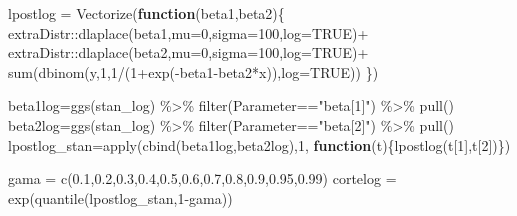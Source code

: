 \documentclass[
]{book}
\newenvironment{Shaded}{\begin{snugshade}}{\end{snugshade}}
\newcommand{\AttributeTok}[1]{\textcolor[rgb]{0.77,0.63,0.00}{#1}}
\newcommand{\ConstantTok}[1]{\textcolor[rgb]{0.00,0.00,0.00}{#1}}
\newcommand{\ControlFlowTok}[1]{\textcolor[rgb]{0.13,0.29,0.53}{\textbf{#1}}}
\newcommand{\DecValTok}[1]{\textcolor[rgb]{0.00,0.00,0.81}{#1}}
\newcommand{\FloatTok}[1]{\textcolor[rgb]{0.00,0.00,0.81}{#1}}
\newcommand{\FunctionTok}[1]{\textcolor[rgb]{0.00,0.00,0.00}{#1}}
\newcommand{\NormalTok}[1]{#1}
\newcommand{\OtherTok}[1]{\textcolor[rgb]{0.56,0.35,0.01}{#1}}
\newcommand{\SpecialCharTok}[1]{\textcolor[rgb]{0.00,0.00,0.00}{#1}}
\newcommand{\StringTok}[1]{\textcolor[rgb]{0.31,0.60,0.02}{#1}}
\begin{document}
\begin{Shaded}
\begin{Highlighting}[]
\NormalTok{lpostlog }\OtherTok{=} \FunctionTok{Vectorize}\NormalTok{(}\ControlFlowTok{function}\NormalTok{(beta1,beta2)\{}
\NormalTok{  extraDistr}\SpecialCharTok{::}\FunctionTok{dlaplace}\NormalTok{(beta1,}\AttributeTok{mu=}\DecValTok{0}\NormalTok{,}\AttributeTok{sigma=}\DecValTok{100}\NormalTok{,}\AttributeTok{log=}\ConstantTok{TRUE}\NormalTok{)}\SpecialCharTok{+}
\NormalTok{  extraDistr}\SpecialCharTok{::}\FunctionTok{dlaplace}\NormalTok{(beta2,}\AttributeTok{mu=}\DecValTok{0}\NormalTok{,}\AttributeTok{sigma=}\DecValTok{100}\NormalTok{,}\AttributeTok{log=}\ConstantTok{TRUE}\NormalTok{)}\SpecialCharTok{+}
  \FunctionTok{sum}\NormalTok{(}\FunctionTok{dbinom}\NormalTok{(y,}\DecValTok{1}\NormalTok{,}\DecValTok{1}\SpecialCharTok{/}\NormalTok{(}\DecValTok{1}\SpecialCharTok{+}\FunctionTok{exp}\NormalTok{(}\SpecialCharTok{{-}}\NormalTok{beta1}\SpecialCharTok{{-}}\NormalTok{beta2}\SpecialCharTok{*}\NormalTok{x)),}\AttributeTok{log=}\ConstantTok{TRUE}\NormalTok{))}
\NormalTok{\})}

\NormalTok{beta1log}\OtherTok{=}\FunctionTok{ggs}\NormalTok{(stan\_log) }\SpecialCharTok{\%\textgreater{}\%} \FunctionTok{filter}\NormalTok{(Parameter}\SpecialCharTok{==}\StringTok{"beta[1]"}\NormalTok{) }\SpecialCharTok{\%\textgreater{}\%} \FunctionTok{pull}\NormalTok{()}
\NormalTok{beta2log}\OtherTok{=}\FunctionTok{ggs}\NormalTok{(stan\_log) }\SpecialCharTok{\%\textgreater{}\%} \FunctionTok{filter}\NormalTok{(Parameter}\SpecialCharTok{==}\StringTok{"beta[2]"}\NormalTok{) }\SpecialCharTok{\%\textgreater{}\%} \FunctionTok{pull}\NormalTok{()}
\NormalTok{lpostlog\_stan}\OtherTok{=}\FunctionTok{apply}\NormalTok{(}\FunctionTok{cbind}\NormalTok{(beta1log,beta2log),}\DecValTok{1}\NormalTok{,}
                    \ControlFlowTok{function}\NormalTok{(t)\{}\FunctionTok{lpostlog}\NormalTok{(t[}\DecValTok{1}\NormalTok{],t[}\DecValTok{2}\NormalTok{])\})}

\NormalTok{gama }\OtherTok{=} \FunctionTok{c}\NormalTok{(}\FloatTok{0.1}\NormalTok{,}\FloatTok{0.2}\NormalTok{,}\FloatTok{0.3}\NormalTok{,}\FloatTok{0.4}\NormalTok{,}\FloatTok{0.5}\NormalTok{,}\FloatTok{0.6}\NormalTok{,}\FloatTok{0.7}\NormalTok{,}\FloatTok{0.8}\NormalTok{,}\FloatTok{0.9}\NormalTok{,}\FloatTok{0.95}\NormalTok{,}\FloatTok{0.99}\NormalTok{)}
\NormalTok{cortelog }\OtherTok{=} \FunctionTok{exp}\NormalTok{(}\FunctionTok{quantile}\NormalTok{(lpostlog\_stan,}\DecValTok{1}\SpecialCharTok{{-}}\NormalTok{gama))}


\end{Highlighting}
\end{Shaded}
\end{document}
